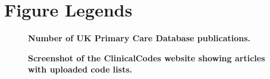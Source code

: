 \documentclass[10pt]{article}
\begin{document}
\section*{Figure Legends}

\begin{figure}[!ht]
\begin{center}
\end{center}
\caption{
    {\bf Number of UK Primary Care Database publications.}
}
\label{figure1_articles_per_year}
\end{figure}

\begin{figure}[!ht]
\begin{center}
\end{center}
\caption{
    {\bf Screenshot of the ClinicalCodes website showing articles with uploaded code lists.}
}
\label{figure2_screenshot}
\end{figure}
\end{document}
